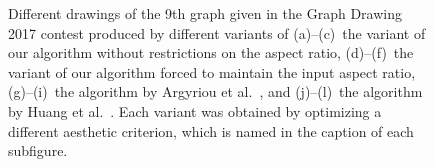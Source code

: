 \documentclass[runningheads]{llncs}
\begin{document}
{\begin{figure}[htbp]
\hfill
{}
\hfill
{}

\caption{Different drawings of the 9th graph given in the Graph Drawing 2017 contest produced by different variants of
(a)--(c)~the variant of our algorithm without restrictions on the aspect ratio, 
(d)--(f)~the variant of our algorithm forced to maintain the input aspect ratio,
(g)--(i)~the algorithm by Argyriou et al.~\cite{DBLP:journals/cj/ArgyriouBS13}, and
(j)--(l)~the algorithm by Huang et al.~\cite{DBLP:journals/vlc/HuangEHL13}.
Each variant was obtained by optimizing a different aesthetic criterion, which is named in the caption of each subfigure.}
\label{fig:graph9}
\end{figure}

}{}
\end{document}
